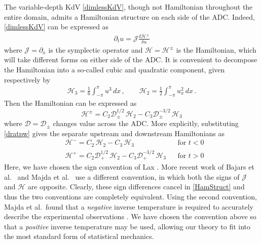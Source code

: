 \documentclass[11pt]{article}
\newcommand{\pdi}[2] { {\partial_#2} #1 }
\newcommand{\dx}{\, dx}
\newcommand{\drat}{\mathcal{D}}
\newcommand{\dratdn}{\drat_+}
\newcommand{\dratupdn}{\drat_{\pm}}
\newcommand{\sympJ}{\mathcal{J}}
\newcommand{\vard}[2]{\frac{\delta #1}{\delta #2}}
\newcommand{\Ham}{\mathcal{H}}
\newcommand{\Hup}{\Ham^{-}}
\newcommand{\Hdn}{\Ham^{+}}
\newcommand{\Hupdn}{\Ham^{\pm}}
\newcommand{\Hthree}{\Ham_{3}}
\newcommand{\Htwo}{\Ham_{2}}
\begin{document}
The variable-depth KdV \eqref{dimlessKdV}, though not Hamiltonian throughout the entire domain, admits a Hamiltonian structure on each side of the ADC. Indeed, \eqref{dimlessKdV} can be expressed as
\begin{align}
\label{HamStruct}
\partial_t{u} = \sympJ \vard{\Hupdn}{u}
\end{align}
where $\sympJ = \pdi{}{x}$ is the symplectic operator and $\Ham = \Hupdn$ is the Hamiltonian, which will take different forms on either side of the ADC. It is convenient to decompose the Hamiltonian into a so-called cubic and quadratic component, given respectively by
\begin{align}
\label{H3H2}
\Hthree = \frac{1}{6} \int_{-\pi}^{\pi} u^3 \dx	\, , \qquad
\Htwo = \frac{1}{2} \int_{-\pi}^{\pi} u_x^2 \dx	\, .
\end{align}
Then the Hamiltonian can be expressed as
\begin{equation}
\label{Hamiltonian}
\Hupdn = C_2 \dratupdn^{1/2} \, \Htwo - C_3 \dratupdn^{-3/2} \, \Hthree
\end{equation}
where $\drat = \dratupdn$ changes value across the ADC. More explicitly, substituting \eqref{dratpw} gives the separate upstream and downstream Hamiltonians as
\begin{align}
&\Hup = C_2 \, \Htwo - C_3 \, \Hthree 						&& \text{for } t<0 \\
&\Hdn = C_2 \dratdn^{1/2} \, \Htwo - C_3 \dratdn^{-3/2} \, \Hthree	&& \text{for } t>0
\end{align}
Here, we have chosen the sign convention of Lax \cite{lax1975periodic}. More recent work of Bajars et al.~\cite{bajars2013weakly} and Majda et al.~\cite{majda2019} use a different convention, in which both the signs of $\sympJ$ and $\Ham$ are opposite. Clearly, these sign differences cancel in \eqref{HamStruct} and thus the two conventions are completely equivalent. Using the second convention, Majda et al.~found that a {\em negative} inverse temperature is required to accurately describe the experimental observations \cite{majda2019}. We have  chosen the convention above so that a {\em positive} inverse temperature may be used, allowing our theory to fit into the most standard form of statistical mechanics.

\end{document}
